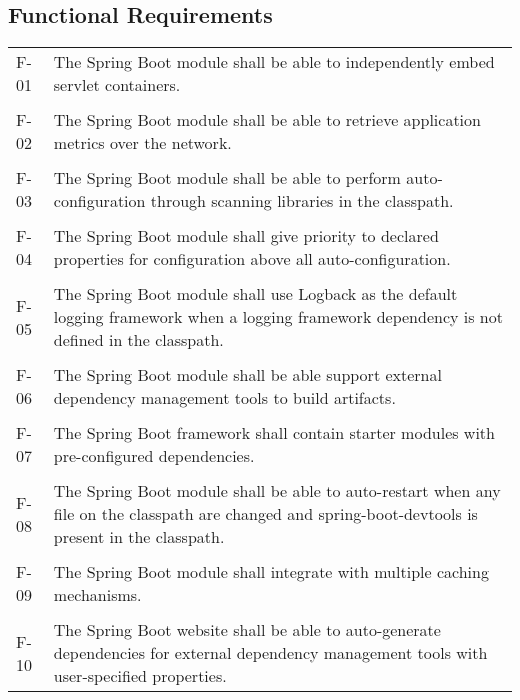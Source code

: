 \subsection{Functional Requirements}

\begin{table}[H]
    \begin{tabular}{l p{13cm}}
    F-01 & The Spring Boot module shall be able to independently embed servlet containers.\\\\
    F-02 & The Spring Boot module shall be able to retrieve application metrics over the network.\\\\
    F-03 & The Spring Boot module shall be able to perform auto-configuration through scanning libraries in the classpath.\\\\
    F-04 & The Spring Boot module shall give priority to declared properties for configuration above all auto-configuration.\\\\
    F-05 & The Spring Boot module shall use Logback as the default logging framework when a logging framework dependency is not defined in the classpath.\\\\
    F-06 & The Spring Boot module shall be able support external dependency management tools to build artifacts.\\\\
    F-07 & The Spring Boot framework shall contain starter modules with pre-configured dependencies.\\\\
    F-08 & The Spring Boot module shall be able to auto-restart when any file on the classpath are changed and spring-boot-devtools is present in the classpath.\\\\
    F-09 & The Spring Boot module shall integrate with multiple caching mechanisms.\\\\
    F-10 & The Spring Boot website shall be able to auto-generate dependencies for external dependency management tools with user-specified properties.
    \end{tabular}
\end{table}